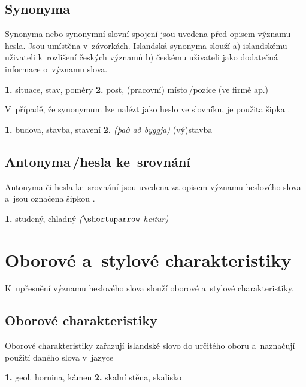 \subsection*{Synonyma}

Synonyma nebo synonymní slovní spojení jsou uvedena před opisem významu hesla. Jsou umístěna v~závorkách. Islandská synonyma slouží a) islandskému uživateli k~rozlišení českých významů b) českému uživateli jako dodatečná informace o~významu slova.

\blspace
  \dicEntry {}   {\textbf{1.}}  {situace, stav, poměry} {\textbf{2.}}  {post, (pracovní) místo\,/\addthin pozice (ve firmě ap.)}
\blspace

V~případě, že synonymum lze nalézt jako heslo ve slovníku, je použita šipka \uv{\dicsymSee}.

\blspace
  \dicEntry {} {  {\textbf{1.}}  {budova, stavba, stavení} {\textbf{2.}} \textit{(það að byggja)} {(vý)stavba} }
\blspace

\subsection*{Antonyma\,/\addthin hesla ke~srovnání}

Antonyma či hesla ke~srovnání jsou uvedena za opisem významu heslového slova a~jsou označena šipkou \uv{$\shortuparrow$}.

\blspace
  \dicEntry {}   {\textbf{1.}} {studený, chladný} \textit{($\shortuparrow$ heitur)}
\blspace

\section{Oborové a~stylové charakteristiky}

K~upřesnění významu heslového slova slouží oborové a~stylové charakteristiky.

\subsection*{Oborové charakteristiky}

Oborové charakteristiky zařazují islandské slovo do určitého oboru a~naznačují použití daného slova v~jazyce

\blspace
  \dicEntry {}   {\textbf{1.}} {\footnotesize{geol.}} {hornina, kámen} {\textbf{2.}}  {skalní stěna, skalisko}
\blspace

